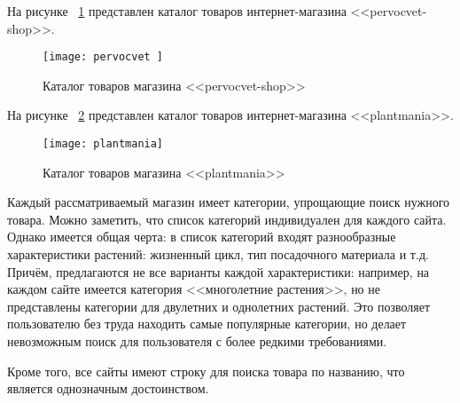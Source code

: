 На рисунке ~\ref{pervocvet:image} представлен каталог товаров интернет-магазина <<pervocvet-shop>>.

\begin{figure}[h!]
	\texttt{[image: pervocvet ]}
	\caption{Каталог товаров магазина <<pervocvet-shop>>}
	\label{pervocvet:image}
\end{figure}


На рисунке ~\ref{plantmania:image} представлен каталог товаров интернет-магазина <<plantmania>>.

\begin{figure}[h!]
	\texttt{[image: plantmania]}
	\caption{Каталог товаров магазина <<plantmania>>}
	\label{plantmania:image}
\end{figure}


Каждый рассматриваемый магазин имеет категории, упрощающие поиск нужного товара. Можно заметить, что список категорий индивидуален для каждого сайта. Однако имеется общая черта: в список категорий входят разнообразные характеристики растений: жизненный цикл, тип посадочного материала и т.д. Причём, предлагаются не все варианты каждой характеристики: например, на каждом сайте имеется категория <<многолетние растения>>, но не представлены категории для двулетних и однолетних растений. Это позволяет пользователю без труда находить самые популярные категории,  но делает невозможным поиск для пользователя с более редкими требованиями.

Кроме того, все сайты имеют строку для поиска товара по названию, что является однозначным достоинством.

